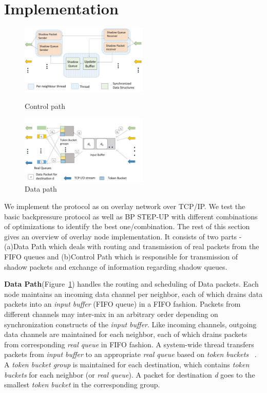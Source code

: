 \label{impl}
\section{Implementation}

\begin{figure}
\centering
\begin{minipage}[b]{0.45\linewidth}
	\includegraphics[width=2.4in]{./figures/controlpath2.pdf}
	\caption{Control path}
	\label{fig:control}
	\centering
\end{minipage}
\begin{minipage}[b]{0.45\linewidth}
	\includegraphics[width=2.4in]{./figures/datapath4.pdf}
	\caption{Data path}
	\label{fig:data} 
	\centering
\end{minipage}
\end{figure}


We implement the protocol as on overlay network over TCP/IP. We test the basic backpressure protocol as well as BP STEP-UP with different combinations of optimizations to identify the best one/combination. The rest of this section gives an overview of overlay node implementation. It consists of two parts - (a)Data Path which deals with routing and transmission of real packets from the FIFO queues and (b)Control Path which is responsible for transmission of shadow packets and exchange of information regarding shadow queues. 

\textbf{Data Path}(Figure~\ref{fig:data}) handles the routing and scheduling of Data packets. Each node maintains an incoming data channel per neighbor, each of which drains data packets into an \textit{input buffer} (FIFO queue) in a FIFO fashion. Packets from different channels may inter-mix in an arbitrary order depending on synchronization constructs of the \textit{input buffer}. Like incoming channels, outgoing data channels are maintained for each neighbor, each of which drains packets from corresponding \textit{real queue} in FIFO fashion. A system-wide thread transfers packets from \textit{input buffer} to an appropriate \textit{real queue} based on \textit{token buckets} ~\cite{Srikant3}. A \textit{token bucket group} is maintained for each destination, which contains \textit{token buckets} for each neighbor (or \textit{real queue}). A packet for destination \textit{d} goes to the smallest \textit{token bucket} in the corresponding group.

